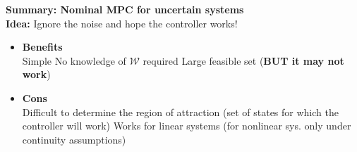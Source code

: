 \textbf{Summary: Nominal MPC for uncertain systems}\\
\textbf{Idea:} Ignore the noise and hope the controller works!\\
\begin{itemize}
    \item \textbf{Benefits}\\
    \rightarrow Simple
    \rightarrow No knowledge of $\mathcal{W}$ required
    \rightarrow Large feasible set (\textbf{BUT it may not work})
    \item \textbf{Cons}\\
    \rightarrow Difficult to determine the region of attraction (set of states for which the controller will work)
    \rightarrow Works for linear systems (for nonlinear sys. only under continuity assumptions)
\end{itemize}